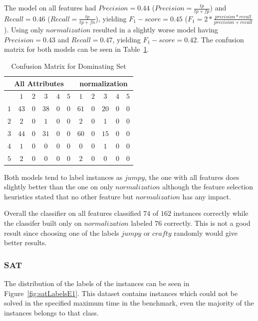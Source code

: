 \par The model on all features had $Precision=0.44$ ($Precision=\frac{tp}{tp+fp}$) and $Recall=0.46$ ($Recall=\frac{tp}{tp+fn}$), yielding $F_1-score=0.45$ ($F_1=2*\frac{precision*recall}{precision+recall}$).
Using only \inline$normalization$ resulted in a slightly worse model having $Precision=0.43$ and $Recall=0.47$, yielding $F_1-score=0.42$. The confusion matrix for both models can be seen in Table~\ref{tbl:dsCME1}. 
\begin{table}[h]
\center
	\begin{tabular}{|c|ccccc|ccccc|}
		\hline
		\multicolumn{6}{|c|}{All Attributes} &\multicolumn{5}{|c|}{normalization}\\
		\hline &$1$&$2$&$3$&$4$&$5$&$1$&$2$&$3$&$4$&$5$\\
		 \hline$1$ & $43$ & $0$ & $38$ & $0$ & $0$ & $61$ & $0$ & $20$ & $0$ & $0$\\
		 $2$ & $2$ & $0$ & $1$ & $0$ & $0$ & $2$ & $0$ & $1$ & $0$ & $0$\\
		 $3$ & $44$ & $0$ & $31$ & $0$ & $0$ & $60$ & $0$& $15$ & $0$ &$0$\\
		 $4$ & $1$ & $0$ & $0$ & $0$ & $0$ &$0$ &$0$&$1$&$0$&$0$\\
		 $5$ & $2$ & $0$& $0$ &$0$&$0$&$2$ &$0$&$0$&$0$&$0$\\
		 \hline
	\end{tabular}
	\caption{Confusion Matrix for Dominating Set}
	\label{tbl:dsCME1}
\end{table}

Both models tend to label instances as \inline$jumpy$, the one with all features does slightly better than the one on only \inline$normalization$ although the feature selection heuristics stated that no other feature but \inline$normalization$ has any impact.

Overall the classifier on all features classified $74$ of $162$ instances correctly while the classifer built only on \inline$normalization$ labeled $76$ correctly. This is not a good result since choosing one of the labels \inline$jumpy$ or \inline$crafty$ randomly would give better results.

\subsubsection{SAT}
The distribution of the labels of the instances can be seen in Figure~\ref{fig:satLabelsE1}. This dataset contains instances which could not be solved in the specified maximum time in the benchmark, even the majority of the instances belongs to that class. 

